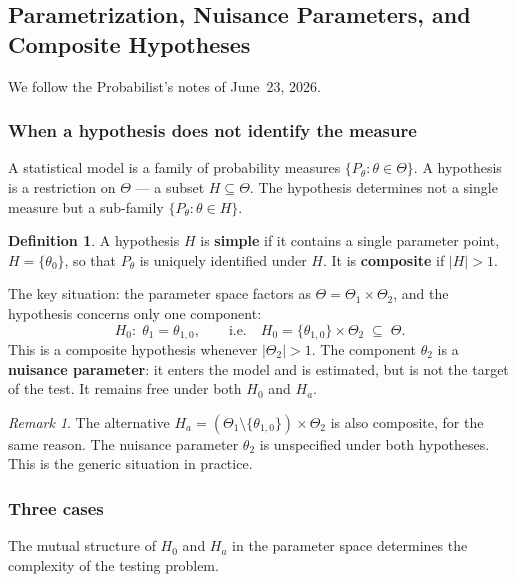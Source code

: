 \documentclass[a4paper,oneside,12pt]{extarticle}
\theoremstyle{plain}
\theoremstyle{definition}
\newtheorem{definition}[proposition]{Definition}
\theoremstyle{remark}
\newtheorem{remark}[proposition]{Remark}
\begin{document}
\subsection{Parametrization, Nuisance Parameters, and Composite Hypotheses}
\label{subsec:param_hyp}

We follow the Probabilist's notes of June~23, 2026.

\subsubsection*{When a hypothesis does not identify the measure}

A statistical model is a family of probability measures
$\{P_\theta : \theta \in \Theta\}$.
A hypothesis is a restriction on $\Theta$ — a subset $H \subseteq \Theta$.
The hypothesis determines not a single measure but a sub-family
$\{P_\theta : \theta \in H\}$.

\begin{definition}
A hypothesis $H$ is \textbf{simple} if it contains a single
parameter point, $H = \{\theta_0\}$, so that $P_\theta$ is uniquely
identified under $H$.  It is \textbf{composite} if $|H| > 1$.
\end{definition}

The key situation: the parameter space factors as
$\Theta = \Theta_1 \times \Theta_2$, and the hypothesis concerns
only one component:
\[
  H_0:\; \theta_1 = \theta_{1,0},
  \qquad\text{i.e.}\quad
  H_0 = \{\theta_{1,0}\} \times \Theta_2 \;\subseteq\; \Theta.
\]
This is a composite hypothesis whenever $|\Theta_2| > 1$.
The component $\theta_2$ is a \textbf{nuisance parameter}: it
enters the model and is estimated, but is not the target of the
test.  It remains free under both $H_0$ and $H_a$.

\begin{remark}
The alternative $H_a = (\Theta_1 \setminus \{\theta_{1,0}\}) \times
\Theta_2$ is also composite, for the same reason.  The nuisance
parameter $\theta_2$ is unspecified under both hypotheses.  This
is the generic situation in practice.
\end{remark}

\subsubsection*{Three cases}

The mutual structure of $H_0$ and $H_a$ in the parameter space
determines the complexity of the testing problem.
\end{document}
